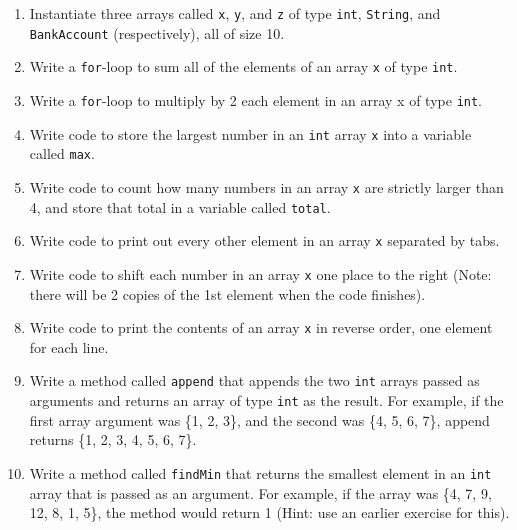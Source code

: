 \begin{enumerate}

\item Instantiate three arrays called \verb|x|, \verb|y|, and \verb|z| of type \verb|int|, \verb|String|, and \verb|BankAccount| (respectively), all of size 10.

\item Write a \verb|for|-loop to sum all of the elements of an array \verb|x| of type \verb|int|.

\item Write a \verb|for|-loop to multiply by 2 each element in an array x of type \verb|int|.

\item Write code to store the largest number in an \verb|int| array \verb|x| into a variable called \verb|max|.

\item Write code to count how many numbers in an array \verb|x| are strictly larger than 4, and store that total in a variable called \verb|total|.

\item Write code to print out every other element in an array \verb|x| separated by tabs.

\item Write code to shift each number in an array \verb|x| one place to the right (Note: there will be 2 copies of the 1st element when the code finishes).

\item Write code to print the contents of an array \verb|x| in reverse order, one element for each line.

\item Write a method called \verb|append| that appends the two \verb|int| arrays passed as arguments and returns an array of type \verb|int| as the result. For example, if the first array argument was \{1, 2, 3\}, and the second was \{4, 5, 6, 7\}, append returns \{1, 2, 3, 4, 5, 6, 7\}.

\item Write a method called \verb|findMin| that returns the smallest element in an \verb|int| array that is passed as an argument. For example, if the array was \{4, 7, 9, 12, 8, 1, 5\}, the method would return 1 (Hint: use an earlier exercise for this).

\end{enumerate}